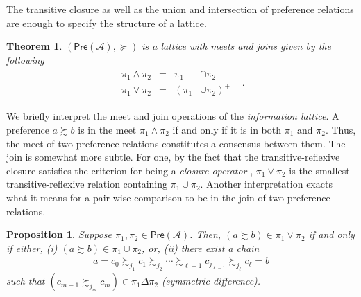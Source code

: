\documentclass[conference]{ieeeconf}
\newcommand{\powerset}[1]{2^{#1}}
\newcommand{\A}{\mathcal{A}}
\newcommand{\X}{\mathcal{X}}
\newcommand{\Pref}{\mathsf{Pre}}
\newcommand{\prefers}{\succsim}
\newcommand{\join}{\vee}
\newcommand{\meet}{\wedge}
\DeclareMathOperator{\cl}{cl}
\DeclareMathOperator{\Cl}{Cl}
\newtheorem{theorem}{Theorem}
\newtheorem{proposition}{Proposition}
\begin{document}

The transitive closure as well as the union and intersection of preference relations are enough to specify the structure of a lattice.

\begin{theorem}
    $(\Pref(\A), \succeq)$ is a lattice with meets and joins given by the following
    \leavevmode
    \begin{align}
    \begin{aligned}
        \pi_1 \meet \pi_2 &=& \pi_1 &\cap \pi_2& \\
 \pi_1 \join \pi_2 &=&  \left(\pi_1  \right. &\left. \cup \pi_2  \right)^{+}
    \end{aligned}. \label{eq:join-meets}
\end{align}
\end{theorem}

We briefly interpret the meet and join operations of the \emph{information lattice}. A preference $a \prefers b$ is in the meet $\pi_1 \meet \pi_2$ if and only if it is in both $\pi_1$ and $\pi_2$. Thus, the meet of two preference relations constitutes a consensus between them. The join is somewhat more subtle. For one, by the fact that the transitive-reflexive closure satisfies the criterion for being a \emph{closure operator} \cite{roman}, $\pi_1 \join \pi_2$ is the smallest transitive-reflexive relation containing $\pi_1 \cup \pi_2$. Another interpretation exacts what it means for a pair-wise comparison to be in the join of two preference relations.
\begin{proposition}
    Suppose $\pi_1, \pi_2 \in \Pref(\A)$. Then, $(a \prefers b) \in \pi_1 \join \pi_2$ if and only if either, (i) $(a \prefers b) \in \pi_1 \cup \pi_2$, or, (ii) there exist a chain
    \begin{align}
        a = c_0 \prefers_{j_1} c_1 \prefers_{j_2}  \cdots \prefers_{\ell-1} c_{j_{\ell-1}} \prefers_{j_\ell} c_{\ell} = b \label{eq:chain}
    \end{align}
    such that $\left( c_{m-1} \prefers_{{j_m}} c_{m} \right) \in \pi_1 \Delta \pi_2$ (symmetric difference).
\end{proposition}
\end{document}
